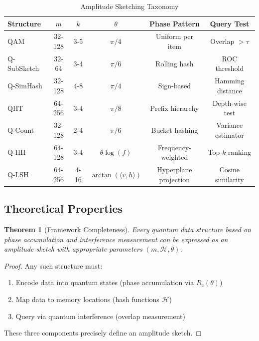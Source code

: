 \documentclass[11pt,letterpaper]{article}
\newtheorem{theorem}{Theorem}
\begin{document}
\begin{table}[ht]
\centering
\caption{Amplitude Sketching Taxonomy}
\label{tab:taxonomy}
\begin{tabular}{lccccc}
\toprule
\textbf{Structure} & $m$ & $k$ & $\theta$ & \textbf{Phase Pattern} & \textbf{Query Test} \\
\midrule
QAM & 32-128 & 3-5 & $\pi/4$ & Uniform per item & Overlap $> \tau$ \\
Q-SubSketch & 32-64 & 3-4 & $\pi/6$ & Rolling hash & ROC threshold \\
Q-SimHash & 32-128 & 4-8 & $\pi/4$ & Sign-based & Hamming distance \\
QHT & 64-256 & 3-4 & $\pi/8$ & Prefix hierarchy & Depth-wise test \\
Q-Count & 32-128 & 2-4 & $\pi/6$ & Bucket hashing & Variance estimator \\
Q-HH & 64-128 & 3-4 & $\theta \log(f)$ & Frequency-weighted & Top-$k$ ranking \\
Q-LSH & 64-256 & 4-16 & $\arctan(\langle v,h\rangle)$ & Hyperplane projection & Cosine similarity \\
\bottomrule
\end{tabular}
\end{table}

\subsection{Theoretical Properties}

\begin{theorem}[Framework Completeness]
\label{thm:framework_completeness}
Every quantum data structure based on phase accumulation and interference measurement can be expressed as an amplitude sketch with appropriate parameters $(m, \mathcal{H}, \theta)$.
\end{theorem}

\begin{proof}
Any such structure must:
\begin{enumerate}
\item Encode data into quantum states (phase accumulation via $R_z(\theta)$)
\item Map data to memory locations (hash functions $\mathcal{H}$)
\item Query via quantum interference (overlap measurement)
\end{enumerate}
These three components precisely define an amplitude sketch.
\end{proof}
\end{document}
